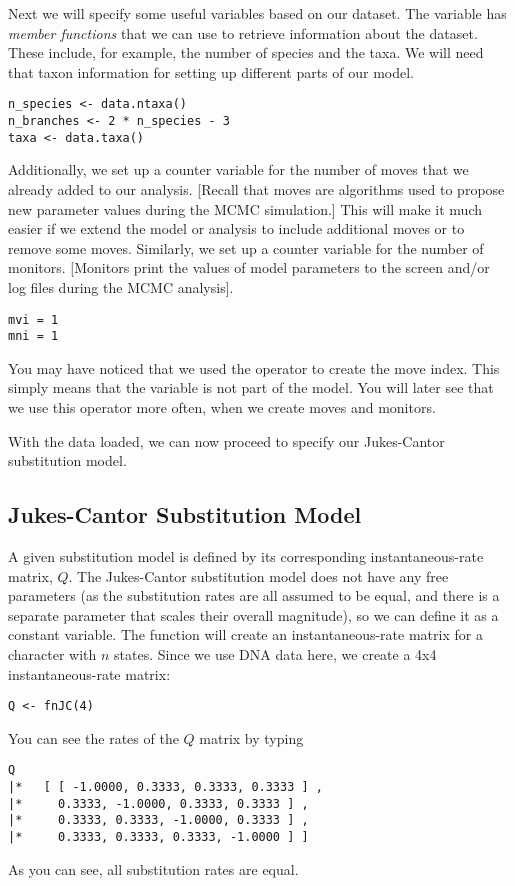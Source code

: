 Next we will specify some useful variables based on our dataset. The variable  has \emph{member functions} that we can use to retrieve information about the dataset. 
These include, for example, the number of species and the taxa.
We will need that taxon information for setting up different parts of our model.
{\tt \begin{snugshade*}
\begin{lstlisting}
n_species <- data.ntaxa()
n_branches <- 2 * n_species - 3
taxa <- data.taxa()
\end{lstlisting}
\end{snugshade*}}

Additionally, we set up a counter variable for the number of moves that we already added to our analysis.
[Recall that moves are algorithms used to propose new parameter values during the MCMC simulation.]
This will make it much easier if we extend the model or analysis to include additional moves or to remove some moves.
Similarly, we set up a counter variable for the number of monitors. 
[Monitors print the values of model parameters to the screen and/or log files during the MCMC analysis].
{\tt \begin{snugshade*}
\begin{lstlisting}
mvi = 1 
mni = 1
\end{lstlisting}
\end{snugshade*}}
You may have noticed that we used the \cl{=} operator to create the move index.
This simply means that the variable is not part of the model.
You will later see that we use this operator more often, \EG when we create moves and monitors.

With the data loaded, we can now proceed to specify our Jukes-Cantor substitution model.

\subsection{Jukes-Cantor Substitution Model}

A given substitution model is defined by its corresponding instantaneous-rate matrix, $Q$.
The Jukes-Cantor substitution model does not have any free parameters (as the substitution rates are all assumed to be equal, and there is a separate parameter that scales their overall magnitude), so we can define it as a constant variable.
The function  will create an instantaneous-rate matrix for a character with $n$ states.
Since we use DNA data here, we create a 4x4 instantaneous-rate matrix:
{\tt \begin{snugshade*}
\begin{lstlisting}
Q <- fnJC(4) 
\end{lstlisting}
\end{snugshade*}}
You can see the rates of the $Q$ matrix by typing
{\tt \begin{snugshade*}
\begin{lstlisting}
Q
|*   [ [ -1.0000, 0.3333, 0.3333, 0.3333 ] ,
|*     0.3333, -1.0000, 0.3333, 0.3333 ] ,
|*     0.3333, 0.3333, -1.0000, 0.3333 ] ,
|*     0.3333, 0.3333, 0.3333, -1.0000 ] ]
\end{lstlisting}
\end{snugshade*}}
As you can see, all substitution rates are equal.


